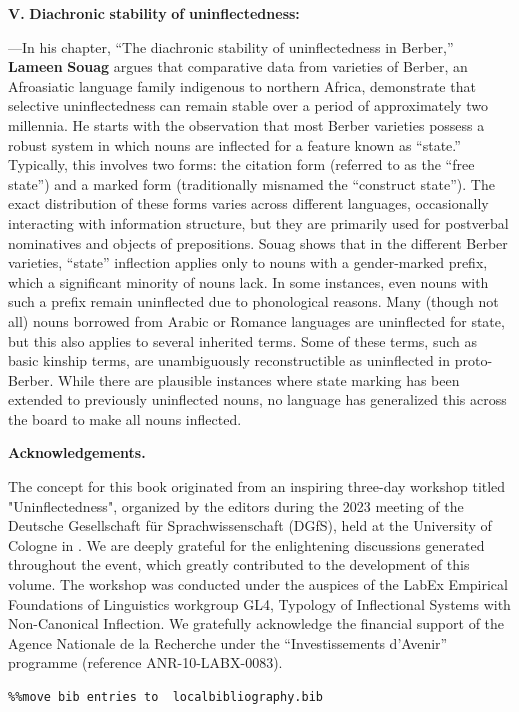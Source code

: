 \documentclass[output=paper]{langscibook}
\begin{document}
\textbf{V.} \textbf{Diachronic} \textbf{stability} \textbf{of} \textbf{uninflectedness:} 

—In his chapter, “The diachronic stability of uninflectedness in Berber,” \textbf{Lameen} \textbf{Souag} argues that comparative data from varieties of Berber, an Afroasiatic language family indigenous to northern Africa, demonstrate that selective uninflectedness can remain stable over a period of approximately two millennia. He starts with the observation that most Berber varieties possess a robust system in which nouns are inflected for a feature known as “state.” Typically, this involves two forms: the citation form (referred to as the “free state”) and a marked form (traditionally misnamed the “construct state”). The exact distribution of these forms varies across different languages, occasionally interacting with information structure, but they are primarily used for postverbal nominatives and objects of prepositions. Souag shows that in the different Berber varieties, “state” inflection applies only to nouns with a gender-marked prefix, which a significant minority of nouns lack. In some instances, even nouns with such a prefix remain uninflected due to phonological reasons. Many (though not all) nouns borrowed from Arabic or Romance languages are uninflected for state, but this also applies to several inherited terms. Some of these terms, such as basic kinship terms, are unambiguously reconstructible as uninflected in proto-Berber. While there are plausible instances where state marking has been extended to previously uninflected nouns, no language has generalized this across the board to make all nouns inflected.

\textbf{Acknowledgements.}

The concept for this book originated from an inspiring three-day workshop titled "Uninflectedness", organized by the editors during the 2023 meeting of the Deutsche Gesellschaft für Sprachwissenschaft (DGfS), held at the University of Cologne in \citealt{March2023}. We are deeply grateful for the enlightening discussions generated throughout the event, which greatly contributed to the development of this volume. The workshop was conducted under the auspices of the LabEx Empirical Foundations of Linguistics workgroup GL4, Typology of Inflectional Systems with Non-Canonical Inflection. We gratefully acknowledge the financial support of the Agence Nationale de la Recherche under the “Investissements d’Avenir” programme (reference ANR-10-LABX-0083).


\begin{verbatim}%%move bib entries to  localbibliography.bib
\end{verbatim}
\sloppy\printbibliography[heading=subbibliography,notkeyword=this]
\end{document}
